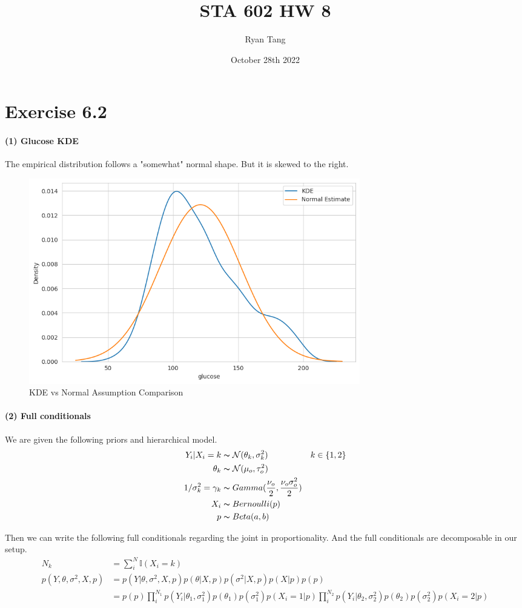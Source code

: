 \documentclass[11pt, letterpaper]{article}
\author{Ryan Tang}
\title{STA 602 HW 8}
\date{October 28th 2022}
\begin{document}
\maketitle

\section{Exercise 6.2}
\paragraph{(1) Glucose KDE}
The empirical distribution follows a "somewhat" normal shape. But it is skewed to the right.
\begin{figure}[!h]
  \centering
  \includegraphics[width=0.7\textwidth]{6.2.1.png}
  \captionsetup{justification=centering}
  \caption{KDE vs Normal Assumption Comparison}
\end{figure}

\paragraph{(2) Full conditionals}
We are given the following priors and hierarchical model.
\begin{align*}
    Y_i|X_i=k &\thicksim \mathcal{N}(\theta_k, \sigma^2_k) && k \in \{1, 2\} \\
    \theta_k &\thicksim \mathcal{N}(\mu_o, \tau_o^2) \\
    1/\sigma^2_k = \gamma_k &\thicksim Gamma(\frac{\nu_o}{2}, \frac{\nu_o\sigma_o^2}{2}) \\
    X_i &\thicksim Bernoulli(p) \\
    p &\thicksim Beta(a, b)
\end{align*}

Then we can write the following full conditionals regarding the joint in proportionality. And the full conditionals are decomposable in our setup. 
\begin{align*}
    N_k &= \sum_i^N \mathbb{I}(X_i=k) \\
    p(Y, \theta, \sigma^2, X, p) &= p(Y|\theta, \sigma^2, X, p) p(\theta|X,p) p(\sigma^2|X,p) p(X|p) p(p) \\
        &= p(p)
           \prod_i^{N_1} p(Y_i|\theta_1, \sigma^2_1)p(\theta_1)p(\sigma^2_1)p(X_i=1|p)
           \prod_i^{N_2} p(Y_i|\theta_2, \sigma^2_2)p(\theta_2)p(\sigma^2_2)p(X_i=2|p)
\end{align*}
\end{document}
